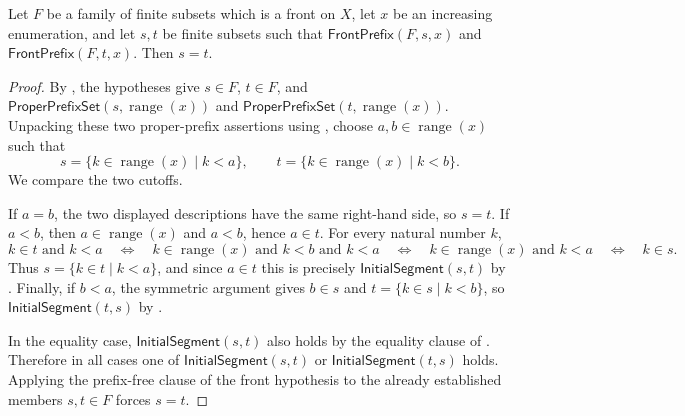 \begin{lemma}
Let $F$ be a family of finite subsets which is a front on $X$, let $x$ be
an increasing enumeration, and let $s,t$ be finite subsets such that
$\mathsf{FrontPrefix}(F,s,x)$ and
$\mathsf{FrontPrefix}(F,t,x)$.
Then $s=t$.
\end{lemma}
\begin{proof}
By , the hypotheses give $s\in F$, $t\in F$, and
\(\mathsf{ProperPrefixSet}(s,\operatorname{range}(x))\) and
\(\mathsf{ProperPrefixSet}(t,\operatorname{range}(x))\).  Unpacking these
two proper-prefix assertions using , choose
$a,b\in\operatorname{range}(x)$ such that
\[
s=\{k\in\operatorname{range}(x)\mid k<a\},\qquad
t=\{k\in\operatorname{range}(x)\mid k<b\}.
\]
We compare the two cutoffs.

If $a=b$, the two displayed descriptions have the same right-hand side,
so $s=t$.  If $a<b$, then $a\in\operatorname{range}(x)$ and $a<b$, hence
$a\in t$.  For every natural number $k$,
\[
k\in t\text{ and }k<a
\quad\Longleftrightarrow\quad
k\in\operatorname{range}(x)\text{ and }k<b\text{ and }k<a
\quad\Longleftrightarrow\quad
k\in\operatorname{range}(x)\text{ and }k<a
\quad\Longleftrightarrow\quad k\in s.
\]
Thus $s=\{k\in t\mid k<a\}$, and since $a\in t$ this is precisely
$\mathsf{InitialSegment}(s,t)$ by .  Finally, if
$b<a$, the symmetric argument gives $b\in s$ and
$t=\{k\in s\mid k<b\}$, so
$\mathsf{InitialSegment}(t,s)$ by .

In the equality case, \(\mathsf{InitialSegment}(s,t)\) also holds by the
equality clause of .  Therefore in all cases one
of $\mathsf{InitialSegment}(s,t)$ or
$\mathsf{InitialSegment}(t,s)$ holds.  Applying the prefix-free clause of
the front hypothesis  to the already established members
$s,t\in F$ forces $s=t$.
\end{proof}
